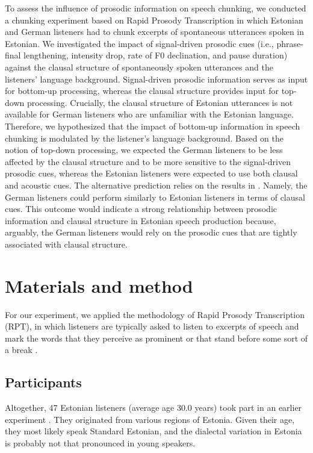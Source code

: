 \documentclass[output=paper]{langscibook}
\begin{document}
    To assess the influence of prosodic information on speech chunking, we conducted a chunking experiment based on Rapid Prosody Transcription \citep[RPT;][]{coleEtAl2010, coleEtAl2011, lmeds} in which Estonian and German listeners had to chunk excerpts of spontaneous utterances spoken in Estonian. We investigated the impact of signal-driven prosodic cues (i.e., phrase-final lengthening, intensity drop, rate of F0 declination, and pause duration) against the clausal structure of spontaneously spoken utterances and the listeners’ language background. Signal-driven prosodic information serves as input for bottom-up processing, whereas the clausal structure provides input for top-down processing. Crucially, the clausal structure of Estonian utterances is not available for German listeners who are unfamiliar with the Estonian language. Therefore, we hypothesized that the impact of bottom-up information in speech chunking is modulated by the listener’s language background. Based on the notion of top-down processing, we expected the German listeners to be less affected by the clausal structure and to be more sensitive to the signal-driven prosodic cues, whereas the Estonian listeners were expected to use both clausal and acoustic cues. The alternative prediction relies on the results in \citet[][]{riesbergEtAl2020}. Namely, the German listeners could perform similarly to Estonian listeners in terms of clausal cues. This outcome would indicate a strong relationship between prosodic information and clausal structure in Estonian speech production because, arguably, the German listeners would rely on the prosodic cues that are tightly associated with clausal structure.
    
    \section{Materials and method}

    For our experiment, we applied the methodology of Rapid Prosody Transcription (RPT), in which listeners are typically asked to listen to excerpts of speech and mark the words that they perceive as prominent or that stand before some sort of a break \citep{coleEtAl2010, coleEtAl2011, lmeds}.

    \subsection{Participants} 
    Altogether, 47 Estonian listeners (average age 30.0 years) took part in an earlier experiment \citep{otsTaremaaOpli2022}. They originated from various regions of Estonia. Given their age, they most likely speak Standard Estonian, and the dialectal variation in Estonia is probably not that pronounced in young speakers. 
    
\end{document}
